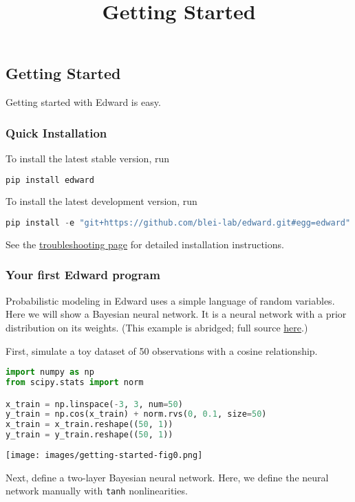 \title{Getting Started}

\subsection{Getting Started}
Getting started with Edward is easy.

\subsubsection{Quick Installation}
To install the latest stable version, run

\begin{lstlisting}[language=Java]
pip install edward
\end{lstlisting}

To install the latest development version, run

\begin{lstlisting}[language=Java]
pip install -e "git+https://github.com/blei-lab/edward.git#egg=edward"
\end{lstlisting}

See the \href{/troubleshooting}{troubleshooting page} for detailed
installation instructions.


\subsubsection{Your first Edward program}

Probabilistic modeling in Edward uses a simple language of
random variables.
Here we will show a Bayesian neural network. It is a neural network
with a prior distribution on its weights.
(This example is abridged; full source
\href{https://github.com/blei-lab/edward/blob/master/examples/getting_started_example.py}
{here}.)

First, simulate a toy dataset of 50 observations with a cosine relationship.

\begin{lstlisting}[language=Python]
import numpy as np
from scipy.stats import norm

x_train = np.linspace(-3, 3, num=50)
y_train = np.cos(x_train) + norm.rvs(0, 0.1, size=50)
x_train = x_train.reshape((50, 1))
y_train = y_train.reshape((50, 1))
\end{lstlisting}

\texttt{[image: images/getting-started-fig0.png]}

Next, define a two-layer Bayesian neural network. Here, we
define the neural network manually with \texttt{tanh} nonlinearities.

